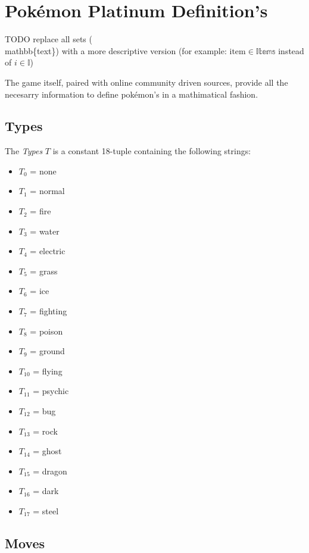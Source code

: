 \section{Pokémon Platinum Definition's}

TODO replace all sets (\\mathbb\{text\}) with a more descriptive version (for example: $\text{item} \in \mathbb{Items}$ instead of $i \in \mathbb{I}$)

The game itself, paired with online community driven sources, provide all the necesarry information to define pokémon's in a mathimatical fashion.

\subsection{Types}


The \emph{Types} $T$ is a constant 18-tuple containing the following strings:
\begin{itemize}
    \item $T_0$  = none
    \item $T_1$  = normal
    \item $T_2$  = fire
    \item $T_3$  = water
    \item $T_4$  = electric
    \item $T_5$  = grass
    \item $T_6$  = ice
    \item $T_7$  = fighting
    \item $T_8$  = poison
    \item $T_9$  = ground
    \item $T_{10}$ = flying
    \item $T_{11}$ = psychic
    \item $T_{12}$ = bug
    \item $T_{13}$ = rock
    \item $T_{14}$ = ghost
    \item $T_{15}$ = dragon
    \item $T_{16}$ = dark
    \item $T_{17}$ = steel
\end{itemize}

\subsection{Moves}


